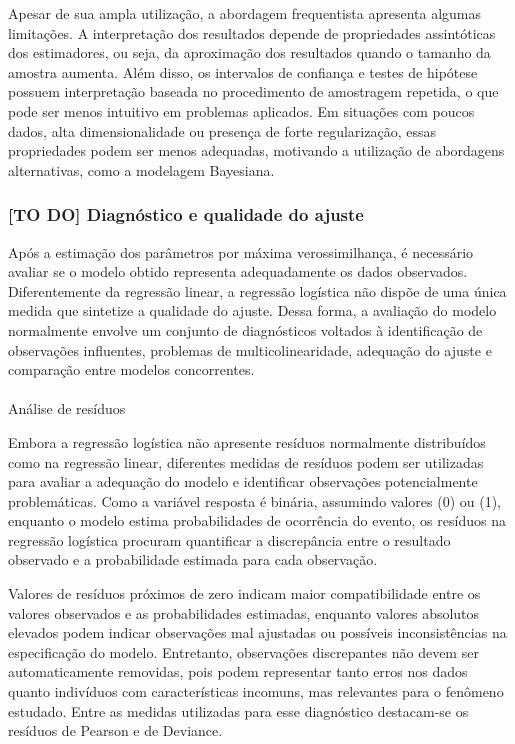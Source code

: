 \documentclass[
  brazilian,
  12pt,
  letterpaper,
  DIV=11,
  numbers=noendperiod]{scrartcl}
\makeatletter
\let\oldparagraph\paragraph
\renewcommand{\paragraph}{
    \@ifstar
      \xxxParagraphStar
      \xxxParagraphNoStar
  }
\newcommand{\xxxParagraphStar}[1]{\oldparagraph*{#1}\mbox{}}
\newcommand{\xxxParagraphNoStar}[1]{\oldparagraph{#1}\mbox{}}
\makeatother
\begin{document}
Apesar de sua ampla utilização, a abordagem frequentista apresenta
algumas limitações. A interpretação dos resultados depende de
propriedades assintóticas dos estimadores, ou seja, da aproximação dos
resultados quando o tamanho da amostra aumenta. Além disso, os
intervalos de confiança e testes de hipótese possuem interpretação
baseada no procedimento de amostragem repetida, o que pode ser menos
intuitivo em problemas aplicados. Em situações com poucos dados, alta
dimensionalidade ou presença de forte regularização, essas propriedades
podem ser menos adequadas, motivando a utilização de abordagens
alternativas, como a modelagem Bayesiana.

\subsubsection{{[}TO DO{]} Diagnóstico e qualidade do
ajuste}\label{to-do-diagnuxf3stico-e-qualidade-do-ajuste}

Após a estimação dos parâmetros por máxima verossimilhança, é necessário
avaliar se o modelo obtido representa adequadamente os dados observados.
Diferentemente da regressão linear, a regressão logística não dispõe de
uma única medida que sintetize a qualidade do ajuste. Dessa forma, a
avaliação do modelo normalmente envolve um conjunto de diagnósticos
voltados à identificação de observações influentes, problemas de
multicolinearidade, adequação do ajuste e comparação entre modelos
concorrentes.

\paragraph{Análise de resíduos}\label{anuxe1lise-de-resuxedduos}

Embora a regressão logística não apresente resíduos normalmente
distribuídos como na regressão linear, diferentes medidas de resíduos
podem ser utilizadas para avaliar a adequação do modelo e identificar
observações potencialmente problemáticas. Como a variável resposta é
binária, assumindo valores (0) ou (1), enquanto o modelo estima
probabilidades de ocorrência do evento, os resíduos na regressão
logística procuram quantificar a discrepância entre o resultado
observado e a probabilidade estimada para cada observação.

Valores de resíduos próximos de zero indicam maior compatibilidade entre
os valores observados e as probabilidades estimadas, enquanto valores
absolutos elevados podem indicar observações mal ajustadas ou possíveis
inconsistências na especificação do modelo. Entretanto, observações
discrepantes não devem ser automaticamente removidas, pois podem
representar tanto erros nos dados quanto indivíduos com características
incomuns, mas relevantes para o fenômeno estudado. Entre as medidas
utilizadas para esse diagnóstico destacam-se os resíduos de Pearson e de
Deviance.
\end{document}
